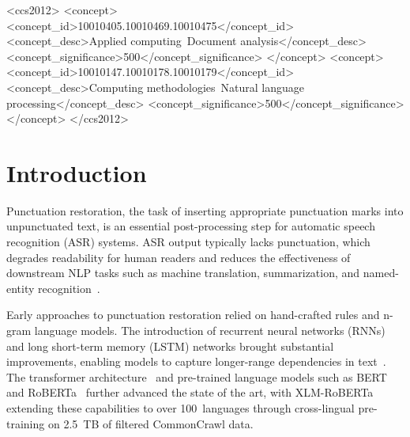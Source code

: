 \documentclass[manuscript, review]{acmart}
\begin{document}
\begin{CCSXML}
<ccs2012>
   <concept>
       <concept_id>10010405.10010469.10010475</concept_id>
       <concept_desc>Applied computing~Document analysis</concept_desc>
       <concept_significance>500</concept_significance>
   </concept>
   <concept>
       <concept_id>10010147.10010178.10010179</concept_id>
       <concept_desc>Computing methodologies~Natural language processing</concept_desc>
       <concept_significance>500</concept_significance>
   </concept>
</ccs2012>
\end{CCSXML}



\maketitle

\section{Introduction}

Punctuation restoration, the task of inserting appropriate punctuation marks into unpunctuated text, is an essential post-processing step for automatic speech recognition (ASR) systems. ASR output typically lacks punctuation, which degrades readability for human readers and reduces the effectiveness of downstream NLP tasks such as machine translation, summarization, and named-entity recognition~\cite{nguyen2019fast, yi2019self}.

Early approaches to punctuation restoration relied on hand-crafted rules and n-gram language models. The introduction of recurrent neural networks (RNNs) and long short-term memory (LSTM) networks brought substantial improvements, enabling models to capture longer-range dependencies in text~\cite{li2020multilingual}. The transformer architecture~\cite{vaswani2017attention} and pre-trained language models such as BERT~\cite{devlin2019bert} and RoBERTa~\cite{liu2019roberta} further advanced the state of the art, with XLM-RoBERTa~\cite{conneau2020unsupervised} extending these capabilities to over 100~languages through cross-lingual pre-training on 2.5~TB of filtered CommonCrawl data.
\end{document}
